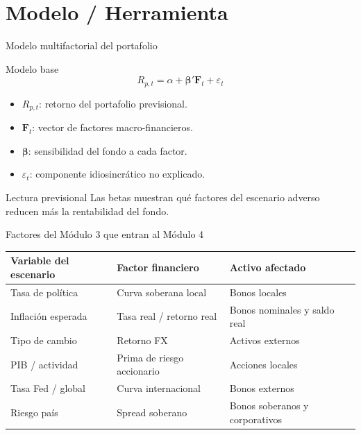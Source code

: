 \documentclass[aspectratio=169,11pt]{beamer}
\begin{document}
\section{Modelo / Herramienta}

\begin{frame}{Modelo multifactorial del portafolio}
\begin{block}{Modelo base}
\[
R_{p,t}=\alpha+\bm{\beta}'\bm{F}_t+\varepsilon_t
\]
\end{block}

\begin{itemize}
  \item $R_{p,t}$: retorno del portafolio previsional.
  \item $\bm{F}_t$: vector de factores macro-financieros.
  \item $\bm{\beta}$: sensibilidad del fondo a cada factor.
  \item $\varepsilon_t$: componente idiosincrático no explicado.
\end{itemize}

\begin{alertblock}{Lectura previsional}
Las betas muestran qué factores del escenario adverso reducen más la rentabilidad del fondo.
\end{alertblock}
\end{frame}

\begin{frame}{Factores del Módulo 3 que entran al Módulo 4}
\begin{table}
\centering
\small
\begin{tabular}{p{} p{} p{}}
\toprule
\textbf{Variable del escenario} & \textbf{Factor financiero} & \textbf{Activo afectado} \\
\midrule
Tasa de política & Curva soberana local & Bonos locales \\
Inflación esperada & Tasa real / retorno real & Bonos nominales y saldo real \\
Tipo de cambio & Retorno FX & Activos externos \\
PIB / actividad & Prima de riesgo accionario & Acciones locales \\
Tasa Fed / global & Curva internacional & Bonos externos \\
Riesgo país & Spread soberano & Bonos soberanos y corporativos \\
\bottomrule
\end{tabular}
\end{table}
\end{frame}
\end{document}
